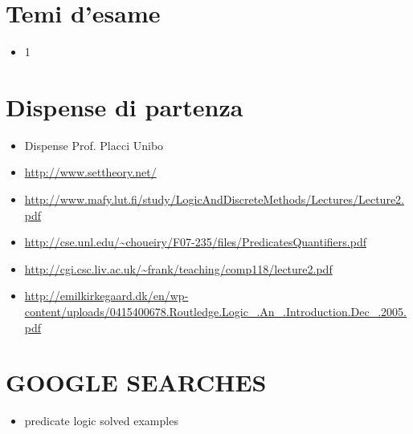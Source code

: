 \documentclass[a4paper,10pt]{article}
\begin{document}
\section{Temi d'esame}
  \begin{itemize}
   \item 1
  \end{itemize}

\section{Dispense di partenza}
\begin{itemize}
  \item Dispense Prof. Placci Unibo
  \item \url{http://www.settheory.net/}
  \item \url{http://www.mafy.lut.fi/study/LogicAndDiscreteMethods/Lectures/Lecture2.pdf}
  \item \url{http://cse.unl.edu/~choueiry/F07-235/files/PredicatesQuantifiers.pdf}
  \item \url{http://cgi.csc.liv.ac.uk/~frank/teaching/comp118/lecture2.pdf}
  \item \url{http://emilkirkegaard.dk/en/wp-content/uploads/0415400678.Routledge.Logic_.An_.Introduction.Dec_.2005.pdf}
\end{itemize}

\section{GOOGLE SEARCHES}
\begin{itemize}
 \item predicate logic solved examples
\end{itemize}
\end{document}
